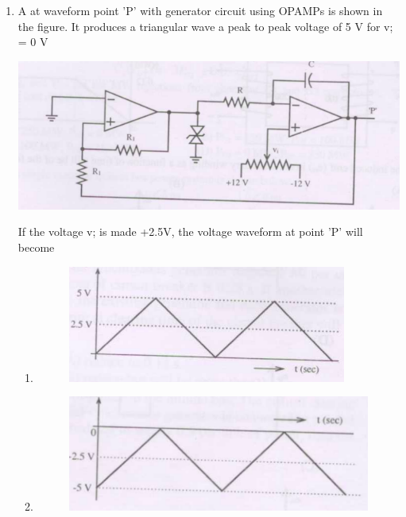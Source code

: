 \documentclass[journal,12pt,onecolumn]{IEEEtran}
\theoremstyle{remark}
\begin{document}
\begin{enumerate}[start=1, label=Q.\arabic*]
\begin{multicols}{2}
\begin{enumerate}[label=(\Alph*)]
    \item (PC) = 2102H, (SP) = 2700H
    \item (PC) = 2700H, (SP) = 2700H
    \item (PC) = 2800H, (SP) = 26FEH
    \item (PC) = 2A02H, (SP) = 2702H
\end{enumerate}
\end{multicols}
\hfill (GATE EE 2008)


\item  A
at waveform point 'P' with generator circuit using OPAMPs is shown in the figure. It produces a triangular wave a peak to peak voltage of 5 V for v; = 0 V

\begin{center}
    \includegraphics[width=\columnwidth]{Fig/q46.png}
\end{center}
If the voltage v; is made +2.5V, the voltage waveform at point 'P' will become
\begin{enumerate}[label=(\Alph*)]
        
    \item 
    \begin{figure}[H]
        \includegraphics[width=0.5\columnwidth]{Fig/q46-A.png}
    \end{figure}


    \item 
    \begin{figure}[H]
        \includegraphics[width=0.5\columnwidth]{Fig/q46-B.png}
    \end{figure}


\end{enumerate}
\end{enumerate}
\end{document}
